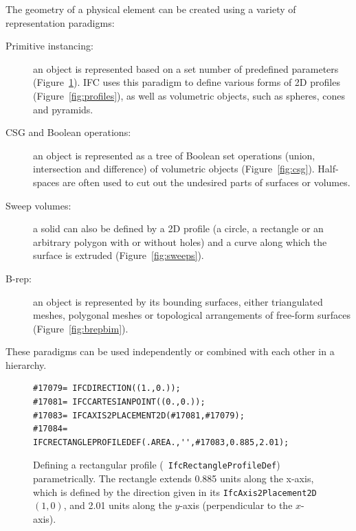 The geometry of a physical element can be created using a variety of representation paradigms:
\begin{description}
  \item[Primitive instancing:] an object is represented based on a set number of predefined parameters (Figure~\ref{fig:parametric}).
  IFC uses this paradigm to define various forms of 2D profiles (Figure~\ref{fig:profiles}), as well as volumetric objects, such as spheres, cones and pyramids.
  \item[CSG and Boolean operations:] an object is represented as a tree of Boolean set operations (union, intersection and difference) of volumetric objects (Figure~\ref{fig:csg}).
  Half-spaces are often used to cut out the undesired parts of surfaces or volumes.
  \item[Sweep volumes:] a solid can also be defined by a 2D profile (a circle, a rectangle or an arbitrary polygon with or without holes) and a curve along which the surface is extruded (Figure~\ref{fig:sweeps}).
  \item[B-rep:] an object is represented by its bounding surfaces, either triangulated meshes, polygonal meshes or topological arrangements of free-form surfaces (Figure~\ref{fig:brepbim}).
\end{description}
These paradigms can be used independently or combined with each other in a hierarchy.

\begin{figure}[htbp]
\begin{lstlisting}[frame=single]
#17079= IFCDIRECTION((1.,0.));
#17081= IFCCARTESIANPOINT((0.,0.));
#17083= IFCAXIS2PLACEMENT2D(#17081,#17079);
#17084= IFCRECTANGLEPROFILEDEF(.AREA.,'',#17083,0.885,2.01);
\end{lstlisting}
\caption{Defining a rectangular profile (\ie\ \texttt{IfcRectangleProfileDef}) parametrically.
The rectangle extends 0.885 units along the x-axis, which is defined by the direction given in its \texttt{IfcAxis2Placement2D} \((1,0)\), and 2.01 units along the \(y\)-axis (perpendicular to the \(x\)-axis).}%
\label{fig:parametric}
\end{figure}

